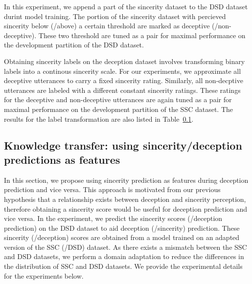 \documentclass{article}
\begin{document}
In this experiment, we append a part of the sincerity dataset to the DSD dataset durint model training.
The portion of the sincerity dataset with percieved sincerity below (/above) a certain threshold are marked as deceptive (/non-deceptive). 
These two threshold are tuned as a pair for maximal performance on the development partition of the DSD dataset. 

Obtaining sincerity labels on the deception dataset involves transforming binary labels into a continous sincerity scale.
For our experiments, we approximate all deceptive utterances to carry a fixed sincerity rating. 
Similarly, all non-decptive utterances are labeled with a different constant sincerity ratings.
These ratings for the deceptive and non-deceptive utterances are again tuned as a pair for maximal performance on the development partition of the SSC dataset.
The results for the label transformation are also listed in Table~\ref{}.

\subsection{Knowledge transfer: using sincerity/deception predictions as features}
In this section, we propose using sincerity prediction as features during deception prediction and vice versa.
This approach is motivated from our previous hypothesis that a relationship exists between deception and sincerity perception, therefore obtaining a sincerity score would be useful for deception prediction and vice versa.
In the experiment, we predict the sincerity scores (/deception prediction) on the DSD dataset to aid deception (/sincerity) prediction. 
These sincerity (/deception) scores are obtained from a model trained on an adapted version of the SSC (/DSD) dataset.
As there exists a mismatch between the SSC and DSD datasets, we perform a domain adaptation to reduce the differences in the distribution of SSC and DSD datasets.
We provide the experimental details for the experiments below.

\end{document}
